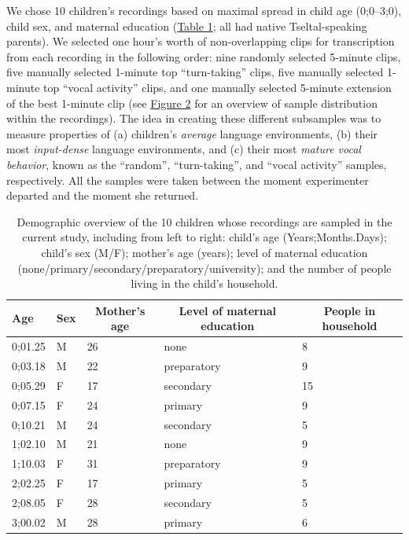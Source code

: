 \documentclass[floatsintext,man]{apa6}
\theoremstyle{definition}
\theoremstyle{definition}
\theoremstyle{definition}
\theoremstyle{remark}
\begin{document}
We chose 10 children's recordings based on maximal spread in child age
(0;0--3;0), child sex, and maternal education
(\protect\hyperlink{tab1}{Table 1}; all had native Tseltal-speaking
parents). We selected one hour's worth of non-overlapping clips for
transcription from each recording in the following order: nine randomly
selected 5-minute clips, five manually selected 1-minute top
\enquote{turn-taking} clips, five manually selected 1-minute top
\enquote{vocal activity} clips, and one manually selected 5-minute
extension of the best 1-minute clip (see \protect\hyperlink{fig2}{Figure
2} for an overview of sample distribution within the recordings). The
idea in creating these different subsamples was to measure properties of
(a) children's \emph{average} language environments, (b) their most
\emph{input-dense} language environments, and (c) their most
\emph{mature vocal behavior}, known as the \enquote{random},
\enquote{turn-taking}, and \enquote{vocal activity} samples,
respectively. All the samples were taken between the moment experimenter
departed and the moment she returned.

\begin{table}[tbp]
\begin{center}
\begin{threeparttable}
\caption{\label{tab:tab1}Demographic overview of the 10 children whose recordings are sampled in the current study, including from left to right: child's age (Years;Months.Days); child's sex (M/F); mother's age (years); level of maternal education (none/primary/secondary/preparatory/university); and the number of people living in the child's household.}
\begin{tabular}{lllll}
\toprule
Age & \multicolumn{1}{c}{Sex} & \multicolumn{1}{c}{Mother's age} & \multicolumn{1}{c}{Level of maternal education} & \multicolumn{1}{c}{People in household}\\
\midrule
0;01.25 & M & 26 & none & 8\\
0;03.18 & M & 22 & preparatory & 9\\
0;05.29 & F & 17 & secondary & 15\\
0;07.15 & F & 24 & primary & 9\\
0;10.21 & M & 24 & secondary & 5\\
1;02.10 & M & 21 & none & 9\\
1;10.03 & F & 31 & preparatory & 9\\
2;02.25 & F & 17 & primary & 5\\
2;08.05 & F & 28 & secondary & 5\\
3;00.02 & M & 28 & primary & 6\\
\bottomrule
\end{tabular}
\end{threeparttable}
\end{center}
\end{table}
\end{document}
